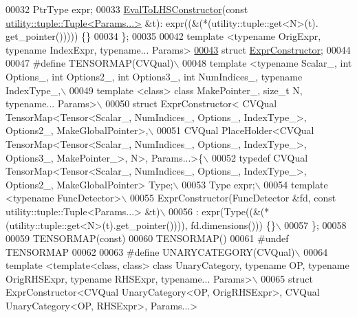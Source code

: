 \begin{DoxyCode}
00032   PtrType expr;
00033   \hyperlink{struct_eigen_1_1_tensor_sycl_1_1internal_1_1_eval_to_l_h_s_constructor}{EvalToLHSConstructor}(\textcolor{keyword}{const} 
      \hyperlink{structutility_1_1tuple_1_1_tuple}{utility::tuple::Tuple<Params...>} &t): expr((&(*(utility::tuple::get<N>(t).
      get\_pointer())))) \{\}
00034 \};
00035 
00042 \textcolor{keyword}{template} <\textcolor{keyword}{typename} OrigExpr, \textcolor{keyword}{typename} IndexExpr, \textcolor{keyword}{typename}... Params>
\hyperlink{struct_eigen_1_1_tensor_sycl_1_1internal_1_1_expr_constructor}{00043} \textcolor{keyword}{struct }\hyperlink{struct_eigen_1_1_tensor_sycl_1_1internal_1_1_expr_constructor}{ExprConstructor};
00044 
00047 \textcolor{preprocessor}{#define TENSORMAP(CVQual)\(\backslash\)}
00048 \textcolor{preprocessor}{template <typename Scalar\_, int Options\_, int Options2\_, int Options3\_, int NumIndices\_, typename
       IndexType\_,\(\backslash\)}
00049 \textcolor{preprocessor}{template <class> class MakePointer\_, size\_t N, typename... Params>\(\backslash\)}
00050 \textcolor{preprocessor}{struct ExprConstructor< CVQual TensorMap<Tensor<Scalar\_, NumIndices\_, Options\_, IndexType\_>, Options2\_,
       MakeGlobalPointer>,\(\backslash\)}
00051 \textcolor{preprocessor}{CVQual PlaceHolder<CVQual TensorMap<Tensor<Scalar\_, NumIndices\_, Options\_, IndexType\_>, Options3\_,
       MakePointer\_>, N>, Params...>\{\(\backslash\)}
00052 \textcolor{preprocessor}{  typedef  CVQual TensorMap<Tensor<Scalar\_, NumIndices\_, Options\_, IndexType\_>, Options2\_,
       MakeGlobalPointer>  Type;\(\backslash\)}
00053 \textcolor{preprocessor}{  Type expr;\(\backslash\)}
00054 \textcolor{preprocessor}{  template <typename FuncDetector>\(\backslash\)}
00055 \textcolor{preprocessor}{  ExprConstructor(FuncDetector &fd, const utility::tuple::Tuple<Params...> &t)\(\backslash\)}
00056 \textcolor{preprocessor}{  : expr(Type((&(*(utility::tuple::get<N>(t).get\_pointer()))), fd.dimensions())) \{\}\(\backslash\)}
00057 \textcolor{preprocessor}{\};}
00058 
00059 TENSORMAP(\textcolor{keyword}{const})
00060 TENSORMAP()
00061 \textcolor{preprocessor}{#undef TENSORMAP}
00062 
00063 \textcolor{preprocessor}{#define UNARYCATEGORY(CVQual)\(\backslash\)}
00064 \textcolor{preprocessor}{template <template<class, class> class UnaryCategory, typename OP, typename OrigRHSExpr, typename RHSExpr,
       typename... Params>\(\backslash\)}
00065 \textcolor{preprocessor}{struct ExprConstructor<CVQual UnaryCategory<OP, OrigRHSExpr>, CVQual UnaryCategory<OP, RHSExpr>, Params...>
}
\end{DoxyCode}
